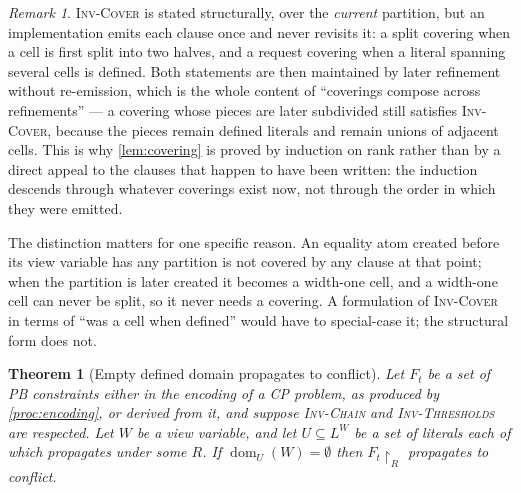 \documentclass[11pt,a4paper]{article}
\theoremstyle{plain}
\newtheorem{theoremT}{Theorem}
\theoremstyle{definition}
\theoremstyle{remark}
\newtheorem*{remark}{Remark}
\newcommand{\fname}[1]{\ensuremath{\operatorname{#1}}}
\newcommand{\dm}{\fname{dom}}
\newcommand{\inv}[1]{\textnormal{\textsc{Inv-#1}}}
\newcommand{\invChain}{\inv{Chain}}
\newcommand{\invThresholds}{\inv{Thresholds}}
\newcommand{\invCover}{\inv{Cover}}
\begin{document}
\begin{remark}
\invCover{} is stated structurally, over the \emph{current} partition, but an
implementation emits each clause once and never revisits it: a split covering
when a cell is first split into two halves, and a request covering when a
literal spanning several cells is defined.  Both statements are then maintained
by later refinement without re-emission, which is the whole content of
``coverings compose across refinements'' --- a covering whose pieces are later
subdivided still satisfies \invCover{}, because the pieces remain defined
literals and remain unions of adjacent cells.  This is why \cref{lem:covering}
is proved by induction on rank rather than by a direct appeal to the clauses
that happen to have been written: the induction descends through whatever
coverings exist now, not through the order in which they were emitted.

The distinction matters for one specific reason.  An equality atom created
before its view variable has any partition is not covered by any clause at
that point; when the partition is later created it becomes a width-one cell,
and a width-one cell can never be split, so it never needs a covering.  A
formulation of \invCover{} in terms of ``was a cell when defined'' would have to
special-case it; the structural form does not.
\end{remark}

\begin{theoremT}[Empty defined domain propagates to conflict]
\label{thm:wipeout}
Let $F_t$ be a set of PB constraints either in the encoding of a CP problem, as
produced by \cref{proc:encoding}, or derived from it, and suppose \invChain{}
and \invThresholds{} are respected.  Let $W$ be a view variable, and let $U\subseteq
L^W$ be a set of literals each of which propagates under some $R$.  If
$\dm_U(W)=\emptyset$ then $F_t\!\restriction_R$ propagates to conflict.
\end{theoremT}
\end{document}
